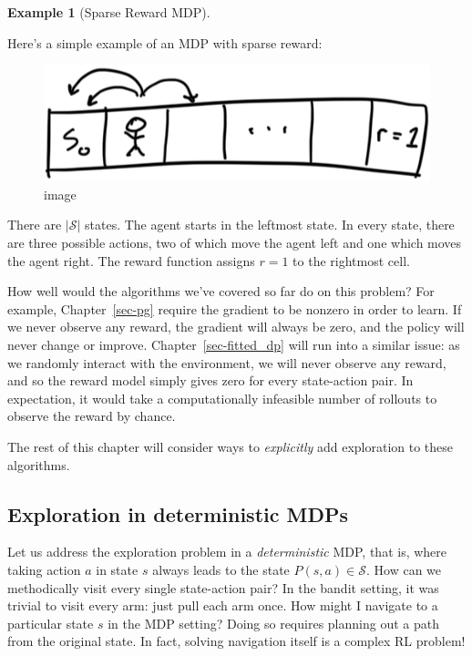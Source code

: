 \documentclass[
  letterpaper,
  DIV=11,
  numbers=noendperiod]{scrreprt}
\theoremstyle{plain}
\theoremstyle{plain}
\theoremstyle{definition}
\newtheorem{example}{Example}[chapter]
\theoremstyle{definition}
\theoremstyle{remark}
\begin{document}
\begin{example}[Sparse Reward
MDP]\protect\hypertarget{exm-sparse_reward_mdp}{}\label{exm-sparse_reward_mdp}

Here's a simple example of an MDP with sparse reward:

\begin{figure}[H]

{\centering \includegraphics{shared/sparse_reward_mdp.png}

}

\caption{image}

\end{figure}%

There are \(|\mathcal{S}|\) states. The agent starts in the leftmost
state. In every state, there are three possible actions, two of which
move the agent left and one which moves the agent right. The reward
function assigns \(r=1\) to the rightmost cell.

\end{example}

How well would the algorithms we've covered so far do on this problem?
For example, Chapter~\ref{sec-pg} require the gradient to be nonzero in
order to learn. If we never observe any reward, the gradient will always
be zero, and the policy will never change or improve.
Chapter~\ref{sec-fitted_dp} will run into a similar issue: as we
randomly interact with the environment, we will never observe any
reward, and so the reward model simply gives zero for every state-action
pair. In expectation, it would take a computationally infeasible number
of rollouts to observe the reward by chance.

The rest of this chapter will consider ways to \emph{explicitly} add
exploration to these algorithms.

\subsection{Exploration in deterministic
MDPs}\label{exploration-in-deterministic-mdps}

Let us address the exploration problem in a \emph{deterministic} MDP,
that is, where taking action \(a\) in state \(s\) always leads to the
state \(P(s, a) \in \mathcal{S}\). How can we methodically visit every
single state-action pair? In the bandit setting, it was trivial to visit
every arm: just pull each arm once. How might I navigate to a particular
state \(s\) in the MDP setting? Doing so requires planning out a path
from the original state. In fact, solving navigation itself is a complex
RL problem!
\end{document}
